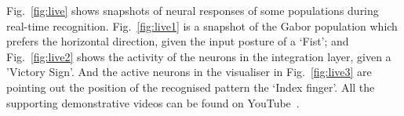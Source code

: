 Fig.~\ref{fig:live} shows snapshots of neural responses of some populations during real-time recognition.
Fig.~\ref{fig:live1} is a snapshot of the Gabor population which prefers the horizontal direction, given the input posture of a `Fist';
and Fig.~\ref{fig:live2} shows the activity of the neurons in the integration layer, given a 'Victory Sign'.
And the active neurons in the visualiser in Fig.~\ref{fig:live3} are pointing out the position of the recognised pattern the `Index finger'. 
All the supporting demonstrative videos can be found on YouTube~\cite{video1, video2, video3}. %

